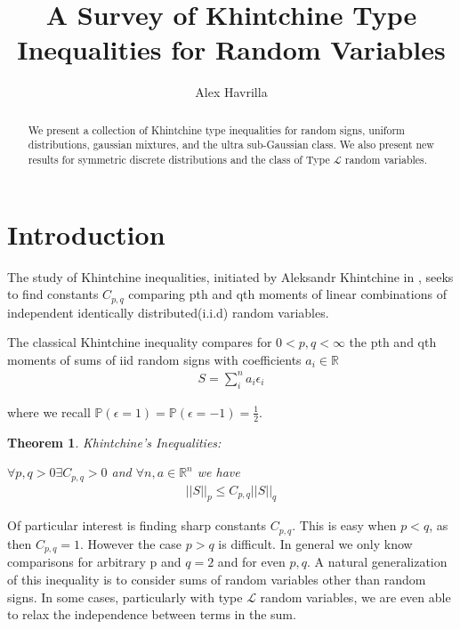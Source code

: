 \documentclass[10pt]{article}
\title{\vspace{-3em}A Survey of Khintchine Type Inequalities for Random Variables}
\author{Alex Havrilla}
\newcommand{\Pp}{\mathbb{P}}
\newcommand{\1}{\textbf{1}}
\newcommand{\R}{\mathbb{R}}
\newtheorem{theorem}{Theorem}
\theoremstyle{remark}
\theoremstyle{definition}
\begin{document}
\maketitle

\begin{abstract}
	We present a collection of Khintchine type inequalities for random signs, uniform distributions, gaussian mixtures, and the ultra sub-Gaussian class. We also present new results for symmetric discrete distributions and the class of Type $\mathcal{L}$ random variables.
\end{abstract}

\newpage

\tableofcontents

\newpage

\section{Introduction} 


The study of Khintchine inequalities, initiated by Aleksandr Khintchine in \cite{K}, seeks to find constants $C_{p,q}$ comparing pth and qth moments of linear combinations of independent identically distributed(i.i.d) random variables. 

The classical Khintchine inequality compares for $0 < p,q < \infty$ the pth and qth moments of sums of iid random signs with coefficients $a_i \in \R$
\begin{align*}
	S = \sum_i^n a_i \epsilon_i
\end{align*}

where we recall $\Pp(\epsilon = 1) = \Pp(\epsilon = -1) = \frac{1}{2}$. 

\begin{theorem}Khintchine's Inequalities:

	$\forall p,q > 0 \exists C_{p,q} > 0$ and $\forall n, a \in \R^n$ we have
	\begin{align*}
		||S||_p \leq C_{p,q} ||S||_q
	\end{align*}
\end{theorem}


Of particular interest is finding sharp constants $C_{p,q}$. This is easy when $p < q$, as then $C_{p,q} = 1$. However the case $p > q$ is difficult. In general we only know comparisons for arbitrary p and $q=2$ and for even $p,q$. A natural generalization of this inequality is to consider sums of random variables other than random signs. In some cases, particularly with type $\mathcal{L}$ random variables, we are even able to relax the independence between terms in the sum. 
\end{document}
